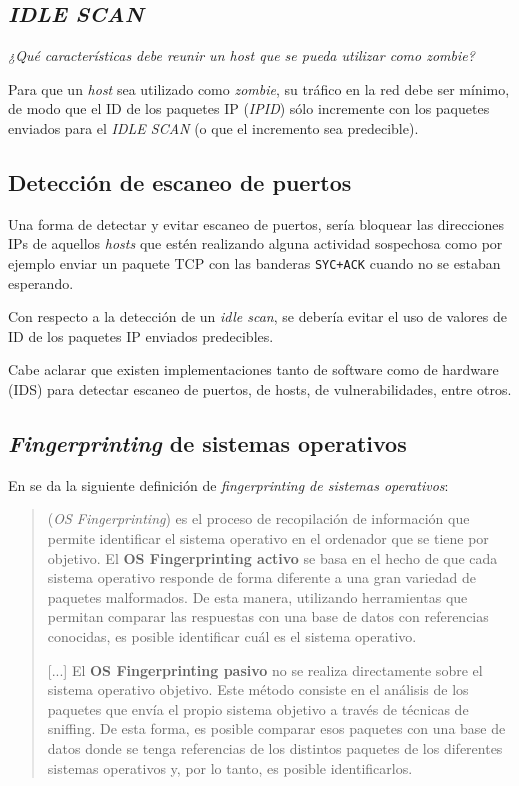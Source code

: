 \subsection{\emph{IDLE SCAN}}

\emph{¿Qué características debe reunir un host que se pueda utilizar como zombie?} 

Para que un \emph{host} sea utilizado como \emph{zombie}, su tráfico en la red debe ser mínimo, de modo que el ID de los paquetes IP (\emph{IPID}) sólo incremente con los paquetes enviados para el \emph{IDLE SCAN} (o que el incremento sea predecible).

\subsection{Detección de escaneo de puertos}

Una forma de detectar y evitar escaneo de puertos, sería bloquear las direcciones IPs de aquellos \emph{hosts} que estén realizando alguna actividad sospechosa como por ejemplo enviar un paquete TCP con las banderas \texttt{SYC+ACK} cuando no se estaban esperando.

Con respecto a la detección de un \emph{idle scan}, se debería evitar el uso de valores de ID de los paquetes IP enviados predecibles.  

Cabe aclarar que existen implementaciones tanto de software como de hardware (IDS) para detectar escaneo de puertos, de hosts, de vulnerabilidades, entre otros.


\subsection{\emph{Fingerprinting} de sistemas operativos}

En \autocite{OSFingerprinting} se da la siguiente definición de \emph{fingerprinting de sistemas operativos}:

\begin{quote}
    (\emph{OS Fingerprinting}) es el proceso de recopilación de información que permite identificar el sistema operativo en el ordenador que se tiene por objetivo. El \textbf{OS Fingerprinting activo} se basa en el hecho de que cada sistema operativo responde de forma diferente a una gran variedad de paquetes malformados. De esta manera, utilizando herramientas que permitan comparar las respuestas con una base de datos con referencias conocidas, es posible identificar cuál es el sistema operativo.
    
    [...] El \textbf{OS Fingerprinting pasivo} no se realiza directamente sobre el sistema operativo objetivo. Este método consiste en el análisis de los paquetes que envía el propio sistema objetivo a través de técnicas de sniffing. De esta forma, es posible comparar esos paquetes con una base de datos donde se tenga referencias de los distintos paquetes de los diferentes sistemas operativos y, por lo tanto, es posible identificarlos.
\end{quote}

